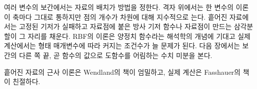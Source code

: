 여러 변수의 보간에서는 자료의 배치가 방법을 정한다. 격자 위에서는 한 변수의 이론이 축마다 그대로 통하지만 점의 개수가 차원에 대해 지수적으로 는다. 흩어진 자료에서는 고정된 기저가 실패하고 자료점에 붙은 방사 기저 함수나 자료점이 만드는 삼각분할이 그 자리를 채운다. RBF의 이론은 양정치 함수라는 해석학의 개념에 기대고 실제 계산에서는 형태 매개변수에 따라 커지는 조건수가 늘 문제가 된다. 다음 장에서는 보간의 다른 쪽 끝, 곧 함수의 값으로 도함수를 어림하는 수치 미분을 본다.

흩어진 자료의 근사 이론은 Wendland의 책\cite{wendland2004}이 엄밀하고, 실제 계산은 Fasshauer의 책\cite{fasshauer2007}이 친절하다.

\chapterreferences
